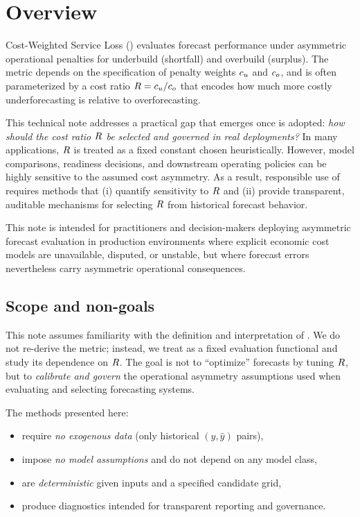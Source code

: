 \section{Overview}
\label{sec:overview}

Cost-Weighted Service Loss (\CWSL{}) evaluates forecast performance under
asymmetric operational penalties for underbuild (shortfall) and overbuild
(surplus). The metric depends on the specification of penalty weights
$c_u$ and $c_o$, and is often parameterized by a cost ratio
$R = c_u/c_o$ that encodes how much more costly underforecasting is relative to
overforecasting.

This technical note addresses a practical gap that emerges once \CWSL{} is adopted:
\emph{how should the cost ratio $R{}$ be selected and governed in real deployments?}
In many applications, $R{}$ is treated as a fixed constant chosen heuristically.
However, model comparisons, readiness decisions, and downstream operating policies
can be highly sensitive to the assumed cost asymmetry. As a result, responsible
use of \CWSL{} requires methods that (i) quantify sensitivity to $R{}$ and
(ii) provide transparent, auditable mechanisms for selecting $R{}$ from historical
forecast behavior.

This note is intended for practitioners and decision-makers deploying asymmetric
forecast evaluation in production environments where explicit economic cost models
are unavailable, disputed, or unstable, but where forecast errors nevertheless
carry asymmetric operational consequences.

\subsection{Scope and non-goals}
\label{subsec:scope}

This note assumes familiarity with the definition and interpretation of \CWSL{}.
We do not re-derive the metric; instead, we treat \CWSL{} as a fixed evaluation
functional and study its dependence on $R{}$.
The goal is not to ``optimize'' forecasts by tuning $R{}$, but to
\emph{calibrate and govern} the operational asymmetry assumptions used when
evaluating and selecting forecasting systems.

The methods presented here:
\begin{itemize}[leftmargin=*]
    \item require \emph{no exogenous data} (only historical $(y, \hat{y})$ pairs),
    \item impose \emph{no model assumptions} and do not depend on any model class,
    \item are \emph{deterministic} given inputs and a specified candidate grid,
    \item produce diagnostics intended for transparent reporting and governance.
\end{itemize}

